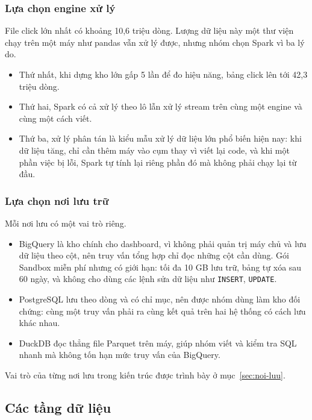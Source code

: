 \subsubsection{Lựa chọn engine xử lý}
File click lớn nhất có khoảng 10,6 triệu dòng. Lượng dữ liệu này một thư viện chạy trên
một máy như pandas vẫn xử lý được, nhưng nhóm chọn Spark vì ba lý do. 
\begin{itemize}
    \item Thứ nhất, khi dựng kho
    lớn gấp 5 lần để đo hiệu năng, bảng click lên tới 42,3 triệu dòng.
    \item Thứ hai, Spark có cả
    xử lý theo lô lẫn xử lý stream trên cùng một engine và cùng một cách viết.
    \item Thứ ba, xử lý phân tán là kiểu mẫu xử lý dữ liệu lớn phổ biến hiện nay: khi dữ liệu tăng, chỉ cần thêm máy vào cụm thay vì viết lại code, và khi một phần việc bị lỗi, Spark tự tính lại riêng phần đó mà không phải chạy lại từ đầu.
\end{itemize}  

\subsubsection{Lựa chọn nơi lưu trữ}
Mỗi nơi lưu có một vai trò riêng. 
\begin{itemize}
    \item BigQuery là kho chính cho dashboard, vì không phải quản trị máy chủ và lưu dữ liệu theo cột, nên truy vấn tổng hợp chỉ đọc những cột cần dùng. Gói Sandbox miễn phí nhưng có giới hạn: tối đa 10 GB lưu trữ, bảng tự xóa sau 60 ngày, và không cho dùng các lệnh sửa dữ liệu như \texttt{INSERT}, \texttt{UPDATE}.
    \item  PostgreSQL lưu theo dòng và có chỉ mục, nên được nhóm dùng làm kho đối chứng: cùng một truy vấn phải ra cùng kết quả trên hai hệ thống có cách lưu khác nhau.
    \item DuckDB đọc thẳng file Parquet trên máy, giúp nhóm viết và kiểm tra SQL nhanh mà không tốn hạn mức truy vấn của BigQuery.
\end{itemize}
Vai trò của từng nơi lưu trong kiến trúc được trình bày ở mục~\ref{sec:noi-luu}.

\subsection{Các tầng dữ liệu}
\label{sec:cac-tang}

